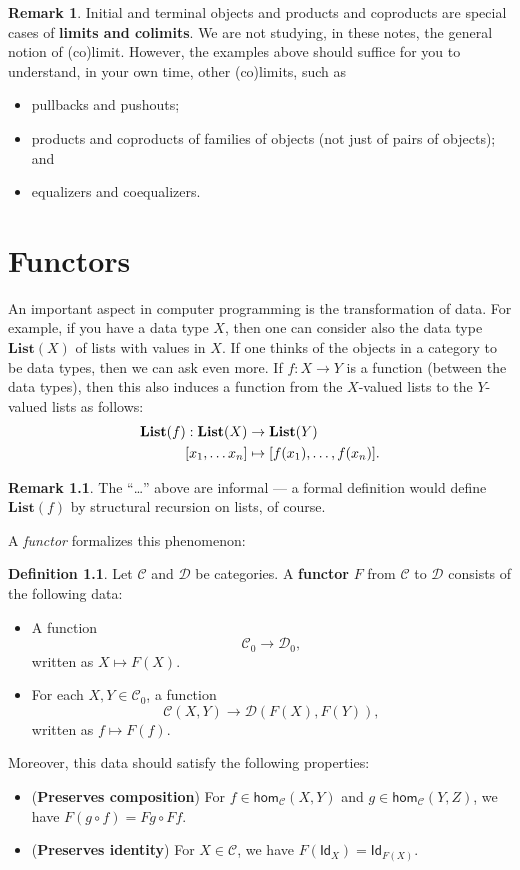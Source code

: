 \documentclass[a4paper,11pt, oneside,titlepage=false]{scrbook}
\theoremstyle{plain}
\theoremstyle{definition}
\newtheorem{rem}[thm]{Remark}
\newtheorem{dfn}[thm]{Definition}
\newcommand{\cfont}[1]{\ensuremath{\mathsf{#1}}}
\newcommand{\Cat}[1]{\mathcal{#1}}
\newcommand{\CC}{\Cat{C}}
\newcommand{\DD}{\Cat{D}}
\newcommand{\Catb}[1]{\mathbf{#1}}
\newcommand{\List}{\Catb{List}}
\newcommand{\Ob}[1]{{#1}_0}
\newcommand{\Hom}[3][]{\cfont{hom}_{#1}(#2,#3)}
\newcommand{\CHom}[3]{{#1}(#2,#3)}
\newcommand{\Id}[1][]{\cfont{Id}_{#1}}
\newcommand{\co}[2]{\ensuremath{#2 \circ #1}}
\begin{document}
\begin{rem}
  Initial and terminal objects and products and coproducts are special cases of \textbf{limits and colimits}.
  We are not studying, in these notes, the general notion of (co)limit.
  However, the examples above should suffice for you to understand, in your own time, other (co)limits, such as
  \begin{itemize}
  \item pullbacks and pushouts;
  \item products and coproducts of families of objects (not just of pairs of objects); and
  \item equalizers and coequalizers.
  \end{itemize}
\end{rem}



\chapter{Functors}\label{sec:functors}
An important aspect in computer programming is the transformation of data. For example, if you have a data type $X$, then one can consider also the data type $\List(X)$ of lists with values in $X$. If one thinks of the objects in a category to be data types, then we can ask even more. If $f:X\to Y$ is a function (between the data types), then this also induces  a function from the $X$-valued lists to the $Y$-valued lists as follows:
\begin{align}\label{eqn:function_on_list}
  \List(f) : \List(X)&\to \List(Y)
  \\
  [x_1,\ldots x_n] &\mapsto [f(x_1),\ldots,f(x_n)]. \notag
\end{align}

\begin{rem}
  The ``\ldots'' above are informal --- a formal definition would define $\List(f)$ by structural recursion on lists, of course.
\end{rem}

A \textit{functor} formalizes this phenomenon:
\begin{dfn} Let $\CC$ and $\DD$ be categories. A \textbf{functor} $F$ from $\CC$ to $\DD$ consists of the following data:
\begin{itemize}
\item A function 
\[
\Ob{\CC} \to \Ob{\DD},
\]
written as $X\mapsto F(X)$.
\item For each $X,Y\in \Ob{\CC}$, a function
\[
\CHom{\CC}{X}{Y} \to \CHom{\DD}{F(X)}{F(Y)},
\]
written as $f\mapsto F(f)$.
\end{itemize}
Moreover, this data should satisfy the following properties:
\begin{itemize}
\item (\textbf{Preserves composition}) For $f\in \Hom[\CC]{X}{Y}$ and $g\in \Hom[\CC]{Y}{Z}$, we have $F(\co f g) = \co {Ff}{Fg}$.
\item (\textbf{Preserves identity}) For $X\in\CC$, we have $F(\Id[X]) = \Id[F(X)]$.
\end{itemize}
\end{dfn}
\end{document}

